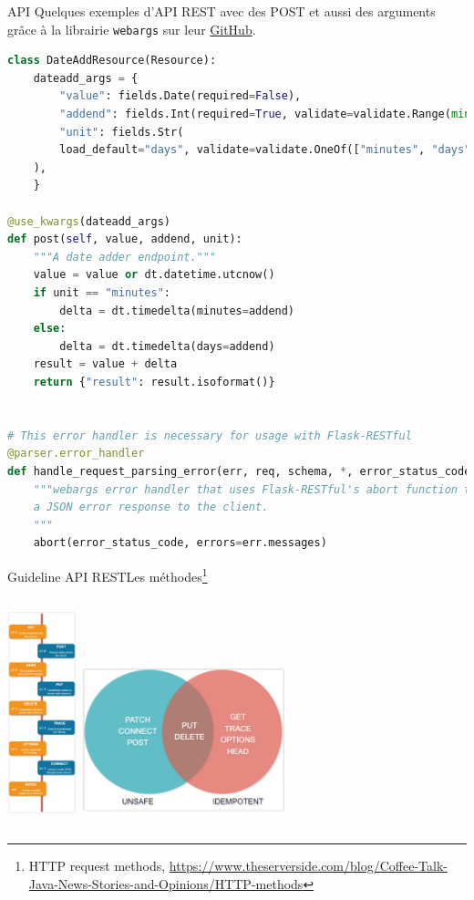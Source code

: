 \documentclass{beamer}
\begin{document}
    \begin{frame}[fragile]{API}
        Quelques exemples d'API REST avec des POST et aussi des arguments grâce à la librairie \lstinline{webargs} sur leur \href{https://github.com/marshmallow-code/webargs/blob/dev/examples/flaskrestful_example.py}{GitHub}.
        \begin{lstlisting}[language=python,basicstyle=\ttfamily\tiny]
class DateAddResource(Resource):
    dateadd_args = {
        "value": fields.Date(required=False),
        "addend": fields.Int(required=True, validate=validate.Range(min=1)),
        "unit": fields.Str(
        load_default="days", validate=validate.OneOf(["minutes", "days"])
    ),
    }

@use_kwargs(dateadd_args)
def post(self, value, addend, unit):
    """A date adder endpoint."""
    value = value or dt.datetime.utcnow()
    if unit == "minutes":
        delta = dt.timedelta(minutes=addend)
    else:
        delta = dt.timedelta(days=addend)
    result = value + delta
    return {"result": result.isoformat()}


# This error handler is necessary for usage with Flask-RESTful
@parser.error_handler
def handle_request_parsing_error(err, req, schema, *, error_status_code, error_headers):
    """webargs error handler that uses Flask-RESTful's abort function to return
    a JSON error response to the client.
    """
    abort(error_status_code, errors=err.messages)
        \end{lstlisting}
    \end{frame}

    \begin{frame}{Guideline API REST}{Les méthodes\footnote{HTTP request methods, \url{https://www.theserverside.com/blog/Coffee-Talk-Java-News-Stories-and-Opinions/HTTP-methods}}}
        \begin{columns}
            \centering
            \includegraphics[width=2cm]{image/rest-http-methods}
            \centering
            \includegraphics[width=6cm]{image/rest-http-methods-safety}
        \end{columns}
    \end{frame}
\end{document}
